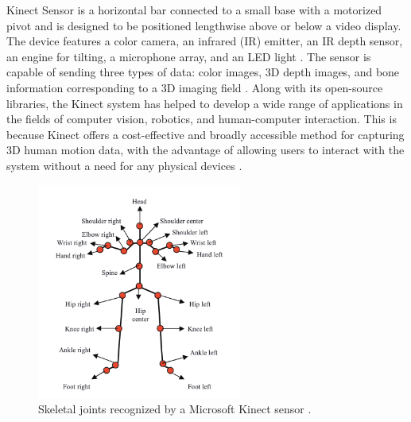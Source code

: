                         Kinect Sensor is a horizontal bar connected to a small base with a motorized pivot and is designed to be positioned lengthwise above or below a video display. The device features a color camera, an infrared (IR) emitter, an IR depth sensor, an engine for tilting, a microphone array, and an LED light \cite{abbasi_motion_2021}. The sensor is capable of sending three types of data: color images, 3D depth images, and bone information corresponding to a 3D imaging field \cite{zheng_cg-recognizer_2022}\cite{acis_classification_2023}. Along with its open-source libraries, the Kinect system has helped to develop a wide range of applications in the fields of computer vision, robotics, and human-computer interaction. This is because Kinect offers a cost-effective and broadly accessible method for capturing 3D human motion data, with the advantage of allowing users to interact with the system without a need for any physical devices \cite{gowing_kinect_2014}.

                
                        \begin{figure}[H]
                            \centering
                            \includegraphics[width=0.6\textwidth]{./resources/images/kinect/joints.png}
                            \caption{Skeletal joints recognized by a Microsoft Kinect sensor \cite{jais_review_2015}.}
                            \label{fig:kinect_sensor_v2}
                        \end{figure}

